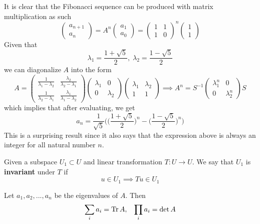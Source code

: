   \begin{example}
  It is clear that the Fibonacci sequence can be produced with matrix multiplication as such 
  \[ \begin{pmatrix}
  a_{n+1} \\ a_n
  \end{pmatrix} = A^n \begin{pmatrix}
  a_1 \\ a_0
  \end{pmatrix} = \begin{pmatrix}
  1&1\\1&0
  \end{pmatrix}^n \begin{pmatrix}
  1\\1
  \end{pmatrix}\]
  Given that 
  \[\lambda_1 = \frac{1+\sqrt{5}}{2}, \; \lambda_2 = \frac{1 - \sqrt{5}}{2}\]
  we can diagonalize $A$ into the form 
  \[A = \begin{pmatrix}
  \frac{1}{\lambda_1 - \lambda_2} & \frac{\lambda_2}{\lambda_2 - \lambda_1} \\
  \frac{1}{\lambda_2 - \lambda_1} & \frac{\lambda_1}{\lambda_1 - \lambda_2}
  \end{pmatrix} \begin{pmatrix}
  \lambda_1 & 0 \\ 0 & \lambda_2 
  \end{pmatrix} \begin{pmatrix}
  \lambda_1 & \lambda_2 \\
  1 & 1
  \end{pmatrix} \implies A^n = S^{-1} \begin{pmatrix}
  \lambda_1^n & 0 \\ 0 & \lambda_2^n 
  \end{pmatrix} S\]
  which implies that after evaluating, we get 
  \[ a_n = \frac{1}{\sqrt{5}} \bigg( \Big(\frac{1+\sqrt{5}}{2}\Big)^n - \Big(\frac{1-\sqrt{5}}{2}\Big)^n \bigg)\]
  This is a surprising result since it also says that the expression above is always an integer for all natural number $n$. 
  \end{example}
  \begin{definition}
  Given a subspace $U_1 \subset U$ and linear transformation $T: U \longrightarrow U$. We say that $U_1$ is \textbf{invariant} under $T$ if 
  \[u \in U_1 \implies T u \in U_1\]
  \end{definition}

  \begin{theorem} 
  Let $a_1, a_2, ..., a_n$ be the eigenvalues of $A$. Then 
  \[\sum_i a_i = \Tr{A}, \;\;\; \prod_i a_i = \det{A}\]
  \end{theorem}

